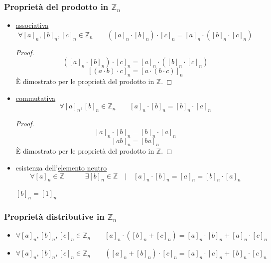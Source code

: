\documentclass[a4paper,12pt, oneside]{book}
\begin{document}
			\subsubsection{Proprietà del prodotto in $\mathbb{Z}_n$}
				\begin{itemize}
					\item \underline{associativa}
						$$\forall [a]_n, [b]_n, [c]_n \in \mathbb{Z}_n \qquad ([a]_n \cdot [b]_n) \cdot [c]_n = [a]_n \cdot ([b]_n \cdot [c]_n)$$
						\begin{proof}
							$$([a]_n \cdot [b]_n) \cdot [c]_n = [a]_n \cdot ([b]_n \cdot [c]_n)$$
							$$[(a \cdot b) \cdot c]_n = [a \cdot (b \cdot c)]_n$$
							È dimostrato per le proprietà del prodotto in $\mathbb{Z}$.
						\end{proof}
					\item \underline{commutativa}
						$$\forall [a]_n, [b]_n \in \mathbb{Z}_n \qquad [a]_n \cdot [b]_n = [b]_n \cdot [a]_n$$
						\begin{proof}
							$$[a]_n \cdot [b]_n = [b]_n \cdot [a]_n$$
							$$[ab]_n = [ba]_n$$
							È dimostrato per le proprietà del prodotto in $\mathbb{Z}$.
						\end{proof}
					\item esistenza dell'\underline{elemento neutro}
						$$\forall [a]_n \in \mathbb{Z} \qquad\quad \exists [b]_n \in \mathbb{Z} \quad | \quad [a]_n \cdot [b]_n=[a]_n=[b]_n \cdot [a]_n$$
						\begin{nota}
							$[b]_n = [1]_n$
						\end{nota}
				\end{itemize}
				
			\subsubsection{Proprietà distributive in $\mathbb{Z}_n$}
				\begin{itemize}
					\item $\forall [a]_n, [b]_n, [c]_n \in \mathbb{Z}_n \qquad [a]_n \cdot ([b]_n + [c]_n) = [a]_n \cdot [b]_n + [a]_n \cdot [c]_n$
					\item $\forall [a]_n, [b]_n, [c]_n \in \mathbb{Z}_n \qquad ([a]_n + [b]_n) \cdot [c]_n = [a]_n \cdot [c]_n + [b]_n \cdot [c]_n$
				\end{itemize}
		
\end{document}
